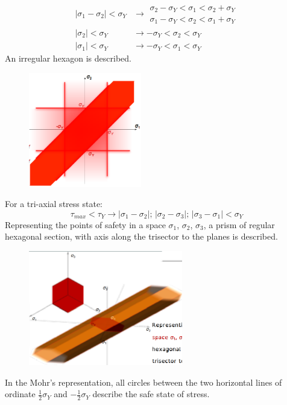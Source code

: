 \documentclass[class=report, crop=false, 12pt,a4paper]{standalone}
\begin{document}
\begin{align}
  \left| \sigma_1 - \sigma_2 \right| < \sigma_Y &\rightarrow \begin{array}{l}
    \sigma_2 - \sigma_Y < \sigma_1 < \sigma_2 + \sigma_Y\\
    \sigma_1 - \sigma_Y < \sigma_2 < \sigma_1 + \sigma_Y
  \end{array}\\
  \left| \sigma_2 \right| < \sigma_Y &\rightarrow - \sigma_Y < \sigma_2 < \sigma_Y\\
  \left| \sigma_1 \right| < \sigma_Y &\rightarrow - \sigma_Y < \sigma_1 < \sigma_Y
\end{align}
An irregular hexagon is described.
\begin{figure}[H]
  \centering
  \includegraphics[height = 5cm]{../img/diagram25.png}
  \caption{}
\end{figure}
For a tri-axial stress state:
\begin{equation}
  \tau_{max} < \tau_Y \rightarrow \left| \sigma_1 - \sigma_2 \right| ; \, \left| \sigma_2 - \sigma_3 \right| ; \, \left| \sigma_3 - \sigma_1 \right| < \sigma_Y
\end{equation}
Representing the points of safety in a space $\sigma_1$, $\sigma_2$, $\sigma_3$, a prism of regular hexagonal section, with axis along the trisector to the planes is described.
\begin{figure}[H]
  \centering
  \includegraphics[height = 5cm]{../img/diagram26.png}
  \caption{}
\end{figure}
In the Mohr's representation, all circles between the two horizontal lines of ordinate $\frac{1}{2}\sigma_Y$ and $-\frac{1}{2}\sigma_Y$ describe the safe state of stress.
\end{document}
